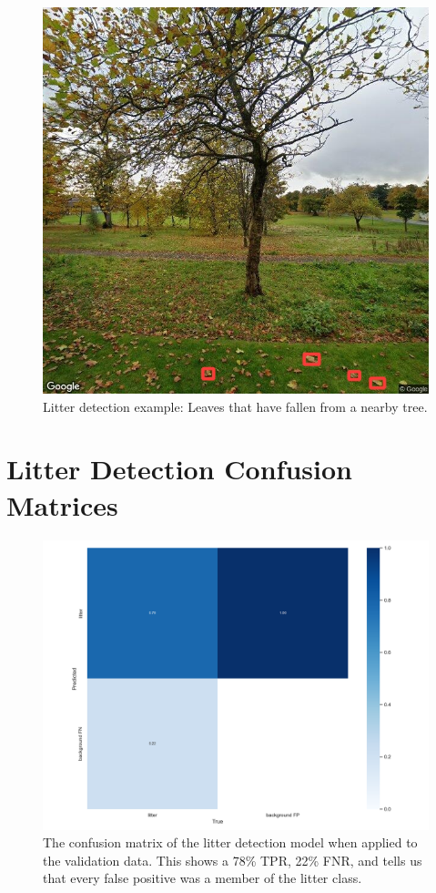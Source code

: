 \documentclass{thesis}
\begin{document}
\begin{appendices}
\begin{figure}[h]
    \centering
    \includegraphics[scale=0.5]{images/flaw-tree-leaves.jpg}
    \caption{Litter detection example: Leaves that have fallen from a nearby tree.}
\end{figure}

\chapter{Litter Detection Confusion Matrices}

\begin{figure}[h!]
    \centering
    \includegraphics[scale=0.5]{images/final-model-confusion-matrix-val.png}
    \caption{The confusion matrix of the litter detection model when applied to the validation data. This shows a 78\% TPR, 22\% FNR, and tells us that every false positive was a member of the litter class.}
    \label{fig:confusion-matrix-validation}
\end{figure}


\end{appendices}
\end{document}
